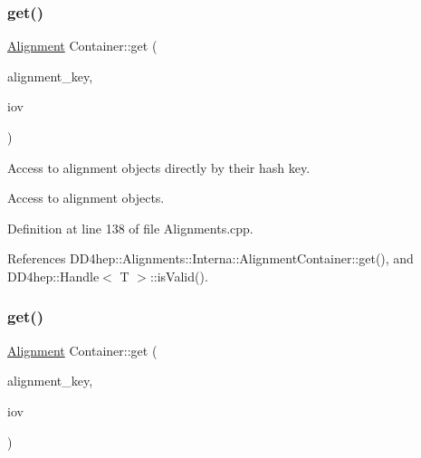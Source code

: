 \subsubsection{\texorpdfstring{get()}{get()}\hspace{0.1cm}{\footnotesize\ttfamily [2/4]}}
{\footnotesize\ttfamily \hyperlink{class_d_d4hep_1_1_alignments_1_1_alignment}{Alignment} Container\+::get (\begin{DoxyParamCaption}\item[{\hyperlink{class_d_d4hep_1_1_alignments_1_1_container_a4101ffa946cedbaf996682533e57c44e}{key\+\_\+type}}]{alignment\+\_\+key,  }\item[{const \hyperlink{class_d_d4hep_1_1_alignments_1_1_container_a0da2fec1e4433deea86defda82886128}{iov\+\_\+type} \&}]{iov }\end{DoxyParamCaption})}



Access to alignment objects directly by their hash key. 

Access to alignment objects. 

Definition at line 138 of file Alignments.\+cpp.



References D\+D4hep\+::\+Alignments\+::\+Interna\+::\+Alignment\+Container\+::get(), and D\+D4hep\+::\+Handle$<$ T $>$\+::is\+Valid().

\hypertarget{class_d_d4hep_1_1_alignments_1_1_container_a6a977251f8ba2b86cd21a81e25af2eab}{}\label{class_d_d4hep_1_1_alignments_1_1_container_a6a977251f8ba2b86cd21a81e25af2eab} 
\subsubsection{\texorpdfstring{get()}{get()}\hspace{0.1cm}{\footnotesize\ttfamily [3/4]}}
{\footnotesize\ttfamily \hyperlink{class_d_d4hep_1_1_alignments_1_1_alignment}{Alignment} Container\+::get (\begin{DoxyParamCaption}\item[{const std\+::string \&}]{alignment\+\_\+key,  }\item[{const \hyperlink{class_d_d4hep_1_1_conditions_1_1_user_pool}{User\+Pool} \&}]{iov }\end{DoxyParamCaption})}



